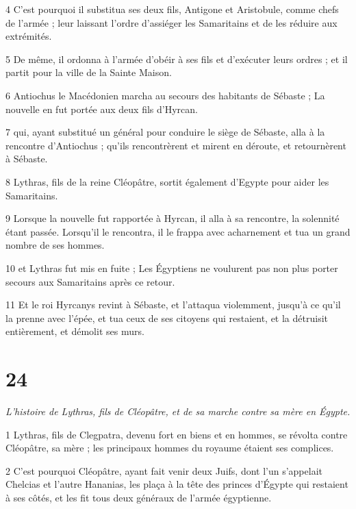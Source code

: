 \par 4 C'est pourquoi il substitua ses deux fils, Antigone et Aristobule, comme chefs de l'armée ; leur laissant l'ordre d'assiéger les Samaritains et de les réduire aux extrémités.

\par 5 De même, il ordonna à l'armée d'obéir à ses fils et d'exécuter leurs ordres ; et il partit pour la ville de la Sainte Maison.

\par 6 Antiochus le Macédonien marcha au secours des habitants de Sébaste ; La nouvelle en fut portée aux deux fils d'Hyrcan.

\par 7 qui, ayant substitué un général pour conduire le siège de Sébaste, alla à la rencontre d'Antiochus ; qu'ils rencontrèrent et mirent en déroute, et retournèrent à Sébaste.

\par 8 Lythras, fils de la reine Cléopâtre, sortit également d'Egypte pour aider les Samaritains.

\par 9 Lorsque la nouvelle fut rapportée à Hyrcan, il alla à sa rencontre, la solennité étant passée. Lorsqu'il le rencontra, il le frappa avec acharnement et tua un grand nombre de ses hommes.

\par 10 et Lythras fut mis en fuite ; Les Égyptiens ne voulurent pas non plus porter secours aux Samaritains après ce retour.

\par 11 Et le roi Hyrcanys revint à Sébaste, et l'attaqua violemment, jusqu'à ce qu'il la prenne avec l'épée, et tua ceux de ses citoyens qui restaient, et la détruisit entièrement, et démolit ses murs.

\chapter{24}

\par \textit{L'histoire de Lythras, fils de Cléopâtre, et de sa marche contre sa mère en Égypte.}

\par 1 Lythras, fils de Clegpatra, devenu fort en biens et en hommes, se révolta contre Cléopâtre, sa mère ; les principaux hommes du royaume étaient ses complices.

\par 2 C'est pourquoi Cléopâtre, ayant fait venir deux Juifs, dont l'un s'appelait Chelcias et l'autre Hananias, les plaça à la tête des princes d'Égypte qui restaient à ses côtés, et les fit tous deux généraux de l'armée égyptienne.

